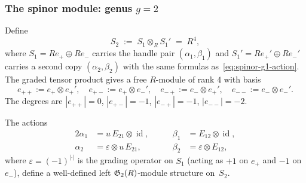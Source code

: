 \subsubsection{The spinor module: genus $g = 2$}

\begin{definition}
Define
\[
S_2 \;:=\; S_1 \otimes_R S_1'
\;=\;
R^4,
\]
where $S_1 = R e_+ \oplus R e_-$ carries the handle pair
$(\alpha_1, \beta_1)$ and
$S_1' = R e_+' \oplus R e_-'$ carries a second copy
$(\alpha_2, \beta_2)$ with the same formulas as~\eqref{eq:spinor-g1-action}.
The graded tensor product gives a free $R$-module of rank $4$
with basis
\[
e_{++} := e_+ \otimes e_+',\quad
e_{+-} := e_+ \otimes e_-',\quad
e_{-+} := e_- \otimes e_+',\quad
e_{--} := e_- \otimes e_-'.
\]
The degrees are
$|e_{++}| = 0$, $|e_{+-}| = -1$, $|e_{-+}| = -1$, $|e_{--}| = -2$.
\end{definition}

\begin{proposition}
The actions
\begin{alignat*}{2}
\alpha_1 &= u\,E_{21} \otimes \operatorname{id},&\qquad
\beta_1 &= E_{12} \otimes \operatorname{id}, \\
\alpha_2 &= \varepsilon \otimes u\,E_{21},&\qquad
\beta_2 &= \varepsilon \otimes E_{12},
\end{alignat*}
where $\varepsilon = (-1)^{|\cdot|}$ is the grading operator
on $S_1$ (acting as $+1$ on $e_+$ and $-1$ on $e_-$),
define a well-defined left $\mathfrak{G}_2(R)$-module structure on~$S_2$.
\end{proposition}

